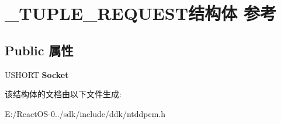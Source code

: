 \hypertarget{struct___t_u_p_l_e___r_e_q_u_e_s_t}{}\section{\+\_\+\+T\+U\+P\+L\+E\+\_\+\+R\+E\+Q\+U\+E\+S\+T结构体 参考}
\label{struct___t_u_p_l_e___r_e_q_u_e_s_t}
\subsection*{Public 属性}
\begin{DoxyCompactItemize}
\item 
\mbox{\label{struct___t_u_p_l_e___r_e_q_u_e_s_t_adad5bb0c9509d2f77ec4f0c39d1cb55b}} 
U\+S\+H\+O\+RT {\bfseries Socket}
\end{DoxyCompactItemize}


该结构体的文档由以下文件生成\+:\begin{DoxyCompactItemize}
\item 
E\+:/\+React\+O\+S-\/0../sdk/include/ddk/ntddpcm.\+h\end{DoxyCompactItemize}
